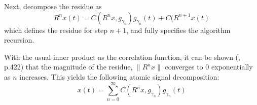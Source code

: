 Next, decompose the residue as 
\[
R^nx(t) = C(R^nx,g_{\gamma_n})g_{\gamma_n}(t) + C(R^{n+1}x(t)
\]
which defines the residue for step $n+1$, and fully specifies the
algorithm recursion.  

With the usual inner product as the correlation function, it can be
shown (\cite{Mallat:1998}, p.422) that the magnitude of the residue,
$\|R^nx\|$ converges to 0 exponentially as $n$ increases.  This yields
the following atomic signal decomposition:
\begin{equation}\label{eq:MP}
x(t) = \sum_{n=0}^\infty C(R^nx,g_{\gamma_n})g_{\gamma_n}(t) 
\end{equation}


